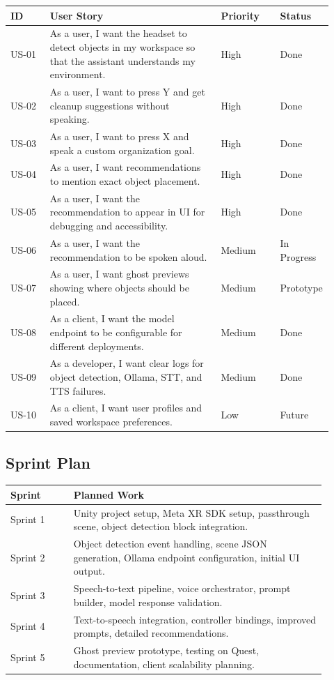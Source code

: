 \documentclass[12pt,a4paper]{article}
\begin{document}
\begin{longtable}{p{0.12\linewidth} p{0.52\linewidth} p{0.18\linewidth} p{0.10\linewidth}}
\toprule
\textbf{ID} & \textbf{User Story} & \textbf{Priority} & \textbf{Status}\\
\midrule
US-01 & As a user, I want the headset to detect objects in my workspace so that the assistant understands my environment. & High & Done\\
US-02 & As a user, I want to press Y and get cleanup suggestions without speaking. & High & Done\\
US-03 & As a user, I want to press X and speak a custom organization goal. & High & Done\\
US-04 & As a user, I want recommendations to mention exact object placement. & High & Done\\
US-05 & As a user, I want the recommendation to appear in UI for debugging and accessibility. & High & Done\\
US-06 & As a user, I want the recommendation to be spoken aloud. & Medium & In Progress\\
US-07 & As a user, I want ghost previews showing where objects should be placed. & Medium & Prototype\\
US-08 & As a client, I want the model endpoint to be configurable for different deployments. & Medium & Done\\
US-09 & As a developer, I want clear logs for object detection, Ollama, STT, and TTS failures. & Medium & Done\\
US-10 & As a client, I want user profiles and saved workspace preferences. & Low & Future\\
\bottomrule
\end{longtable}

\subsection{Sprint Plan}

\begin{longtable}{p{0.18\linewidth} p{0.72\linewidth}}
\toprule
\textbf{Sprint} & \textbf{Planned Work}\\
\midrule
Sprint 1 & Unity project setup, Meta XR SDK setup, passthrough scene, object detection block integration.\\
Sprint 2 & Object detection event handling, scene JSON generation, Ollama endpoint configuration, initial UI output.\\
Sprint 3 & Speech-to-text pipeline, voice orchestrator, prompt builder, model response validation.\\
Sprint 4 & Text-to-speech integration, controller bindings, improved prompts, detailed recommendations.\\
Sprint 5 & Ghost preview prototype, testing on Quest, documentation, client scalability planning.\\
\bottomrule
\end{longtable}
\end{document}
